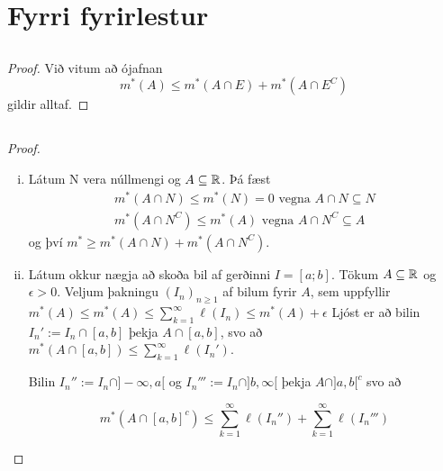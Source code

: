 \documentclass[12pt]{book} \usepackage[utf8]{inputenc}
\begin{document}
\section{Fyrri fyrirlestur}
\subsection{}
\begin{proof}
  Við vitum að ójafnan
  \[m^*(A) \leq m^*(A \cap E) + m^*(A \cap E^C) \] gildir alltaf.

\end{proof}

\subsection{}
\begin{proof}
  \begin{enumerate}[(i)]
  \item Látum N vera núllmengi og $A \subseteq \mathbb{R}$. Þá fæst
    \begin{gather*}
      m^*(A\cap N) \leq m^*(N) = 0 \text{ vegna } A \cap N \subseteq N \\
      m^*(A \cap N^C) \leq m^*(A) \text{ vegna } A \cap N^C
      \subseteq A
    \end{gather*}
    og því $m^* \geq m^*(A \cap N) + m^*(A\cap N^C)$.


  \item Látum okkur nægja að skoða bil af gerðinni $I =
    [a;b]$.
    Tökum $A \subseteq \mathbb{R}$ og $\epsilon > 0$. Veljum þakningu
    $(I_n)_{n\geq 1}$ af bilum fyrir $A$, sem uppfyllir
    $m^*(A) \leq m^*(A) \leq \sum_{k=1}^{\infty} \ell(I_n) \leq
    m^*(A) + \epsilon$
    Ljóst er að bilin $I_n' := I_n \cap [a,b]$ þekja
    $A \cap [a,b]$, svo að
    $m^*(A \cap [a,b]) \leq \sum_{k=1}^{\infty} \ell(I_n')$.

    Bilin $I_n'' := I_n \cap ]- \infty, a[$ og
    $I_n''' := I_n \cap ]b, \infty [ $ þekja $A \cap ]a,b[^c$ svo
    að

    \[ m^*(A \cap [a,b]^c) \leq \sum_{k=1}^{\infty} \ell(I_n'') +
    \sum_{k=1}^{\infty} \ell(I_n''') \]
  \end{enumerate}

\end{proof}

\subsection{}
\end{document}

